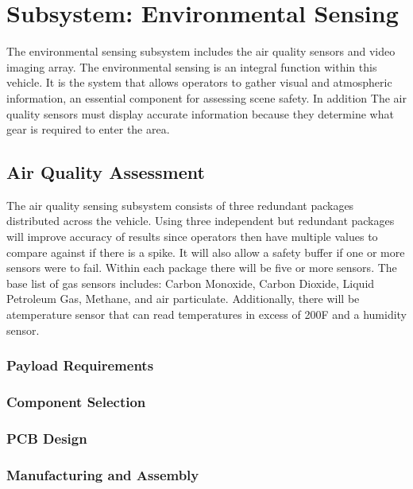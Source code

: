 \chapter{Subsystem: Environmental Sensing}

The environmental sensing subsystem includes the air quality sensors and video imaging array. The environmental sensing is an integral function within this vehicle. It is the system that allows operators to gather visual and atmospheric information, an essential component for assessing scene safety. In addition The air quality sensors must display accurate information because they determine what gear is required to enter the area.

\section{Air Quality Assessment}

The air quality sensing subsystem consists of three redundant packages distributed across the vehicle. Using three independent but redundant packages will improve accuracy of results since operators then have multiple values to compare against if there is a spike. It will also allow a safety buffer if one or more sensors were to fail. Within each package there will be five or more sensors. The base list of gas sensors includes: Carbon Monoxide, Carbon Dioxide, Liquid Petroleum Gas, Methane, and air particulate. Additionally, there will be atemperature sensor that can read temperatures in excess of 200\degree F and a humidity sensor. 

\subsection{Payload Requirements}

\subsection{Component Selection}

\subsection{PCB Design}

\subsection{Manufacturing and Assembly}

